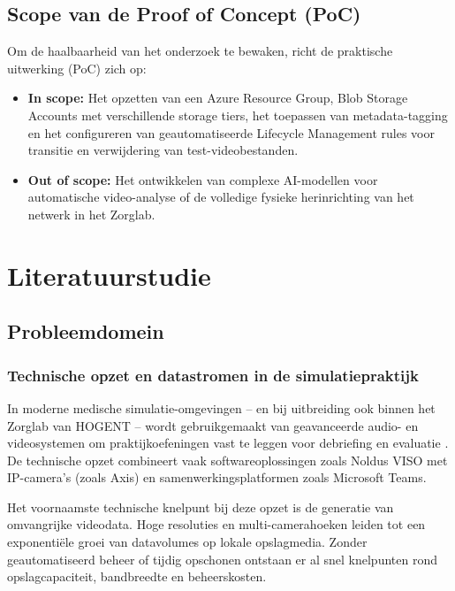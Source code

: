 \subsection{Scope van de Proof of Concept (PoC)}%
\label{subsec:scope}

Om de haalbaarheid van het onderzoek te bewaken, richt de praktische uitwerking (PoC) zich op:
\begin{itemize}
    \item \textbf{In scope:} Het opzetten van een Azure Resource Group, Blob Storage Accounts met verschillende storage tiers, het toepassen van metadata-tagging en het configureren van geautomatiseerde Lifecycle Management rules voor transitie en verwijdering van test-videobestanden.
    \item \textbf{Out of scope:} Het ontwikkelen van complexe AI-modellen voor automatische video-analyse of de volledige fysieke herinrichting van het netwerk in het Zorglab.
\end{itemize}


\section{Literatuurstudie}%
\label{sec:literatuurstudie}

\subsection{Probleemdomein}%
\label{subsec:lit_probleemdomein}

\subsubsection{Technische opzet en datastromen in de simulatiepraktijk}
In moderne medische simulatie-omgevingen -- en bij uitbreiding ook binnen het Zorglab van HOGENT -- wordt gebruikgemaakt van geavanceerde audio- en videosystemen om praktijkoefeningen vast te leggen voor debriefing en evaluatie \parencite{CHSU2023}. De technische opzet combineert vaak softwareoplossingen zoals Noldus VISO met IP-camera's (zoals Axis) en samenwerkingsplatformen zoals Microsoft Teams.

Het voornaamste technische knelpunt bij deze opzet is de generatie van omvangrijke videodata. Hoge resoluties en multi-camerahoeken leiden tot een exponentiële groei van datavolumes op lokale opslagmedia. Zonder geautomatiseerd beheer of tijdig opschonen ontstaan er al snel knelpunten rond opslagcapaciteit, bandbreedte en beheerskosten.

